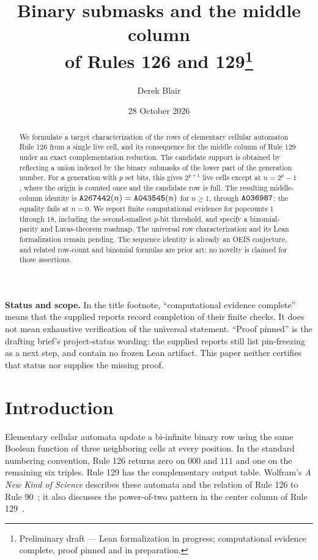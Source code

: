 \documentclass[11pt]{article}
\title{Binary submasks and the middle column\protect\\
of Rules 126 and 129\thanks{Preliminary draft --- Lean formalization in progress;
computational evidence complete, proof pinned and in preparation.}}
\author{Derek Blair}
\date{28 October 2026}
\newcommand{\seq}[1]{\text{\texttt{#1}}}
\begin{document}
\maketitle

\begin{abstract}
We formulate a target characterization of the rows of elementary cellular
automaton Rule 126 from a single live cell, and its consequence for the middle
column of Rule 129 under an exact complementation reduction. The candidate
support is obtained by reflecting a union indexed by the binary submasks of
the lower part of the generation number. For a generation with $p$ set bits,
this gives $2^{p+1}$ live cells except at $n=2^p-1$, where the origin is
counted once and the candidate row is full. The resulting middle-column
identity is $\seq{A267442}(n)=\seq{A043545}(n)$ for $n\geq1$, through
$\seq{A036987}$; the equality fails at $n=0$. We report finite computational
evidence for popcounts $1$ through $18$, including the second-smallest
$p$-bit threshold, and specify a binomial-parity and Lucas-theorem roadmap.
The universal row characterization and its Lean formalization remain
pending. The sequence identity is already an OEIS conjecture, and related
row-count and binomial formulas are prior art; no novelty is claimed for
those assertions.
\end{abstract}

\noindent\textbf{Status and scope.}
In the title footnote, ``computational evidence complete'' means that the
supplied reports record completion of their finite checks. It does not mean
exhaustive verification of the universal statement. ``Proof pinned'' is the
drafting brief's project-status wording: the supplied reports still list
pin-freezing as a next step, and contain no frozen Lean artifact. This paper
neither certifies that status nor supplies the missing proof.

\section{Introduction}

Elementary cellular automata update a bi-infinite binary row using the same
Boolean function of three neighboring cells at every position. In the
standard numbering convention, Rule 126 returns zero on $000$ and $111$ and
one on the remaining six triples. Rule 129 has the complementary output
table. Wolfram's \emph{A New Kind of Science} describes these automata and
the relation of Rule 126 to Rule 90~\cite{wolfram126}; it also discusses the
power-of-two pattern in the center column of Rule 129~\cite{wolfram129}.
\end{document}
